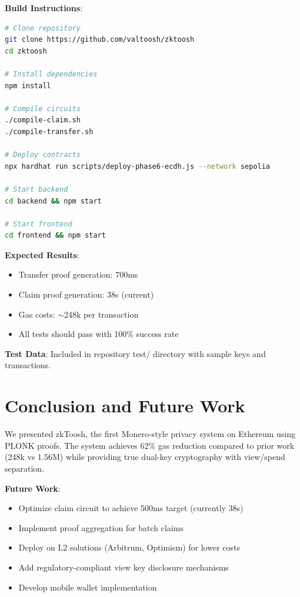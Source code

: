 \documentclass[conference]{IEEEtran}
\begin{document}
\textbf{Build Instructions}:
\begin{lstlisting}[language=bash]
# Clone repository
git clone https://github.com/valtoosh/zktoosh
cd zktoosh

# Install dependencies
npm install

# Compile circuits
./compile-claim.sh
./compile-transfer.sh

# Deploy contracts
npx hardhat run scripts/deploy-phase6-ecdh.js --network sepolia

# Start backend
cd backend && npm start

# Start frontend
cd frontend && npm start
\end{lstlisting}

\textbf{Expected Results}:
\begin{itemize}
    \item Transfer proof generation: 700ms
    \item Claim proof generation: 38s (current)
    \item Gas costs: $\sim$248k per transaction
    \item All tests should pass with 100\% success rate
\end{itemize}

\textbf{Test Data}: Included in repository test/ directory with sample keys and transactions.

% 
% 
\section{Conclusion and Future Work}
\label{sec:conclusion}

We presented zkToosh, the first Monero-style privacy system on Ethereum using PLONK proofs. The system achieves 62\% gas reduction compared to prior work (248k vs 1.56M) while providing true dual-key cryptography with view/spend separation.

\textbf{Future Work}:
\begin{itemize}
    \item Optimize claim circuit to achieve 500ms target (currently 38s)
    \item Implement proof aggregation for batch claims
    \item Deploy on L2 solutions (Arbitrum, Optimism) for lower costs
    \item Add regulatory-compliant view key disclosure mechanisms
    \item Develop mobile wallet implementation
\end{itemize}
\end{document}
